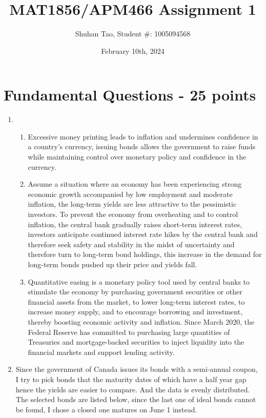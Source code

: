 \documentclass{article}
\title{MAT1856/APM466 Assignment 1}
\author{Shuhan Tao, Student \#: 1005094568}
\date{February 10th, 2024}
\begin{document}
\maketitle

\section*{Fundamental Questions - 25 points}

\begin{enumerate}
    \item \hfill
    \begin{enumerate}
        \item Excessive money printing leads to inflation and undermines confidence in a country's currency, issuing bonds allows the government to raise funds while maintaining control over monetary policy and confidence in the currency.
        \item Assume a situation where an economy has been experiencing strong economic growth accompanied by low employment and moderate inflation, the long-term yields are less attractive to the pessimistic investors. To prevent the economy from overheating and to control inflation, the central bank gradually raises short-term interest rates, investors anticipate continued interest rate hikes by the central bank and therefore seek safety and stability in the midst of uncertainty and therefore turn to long-term bond holdings, this increase in the demand for long-term bonds pushed up their price and yields fall.
        \item Quantitative easing is a monetary policy tool used by central banks to stimulate the economy by purchasing government securities or other financial assets from the market, to lower long-term interest rates, to increase money supply, and to encourage borrowing and investment, thereby boosting economic activity and inflation. Since March 2020, the Federal Reserve has committed to purchasing large quantities of Treasuries and mortgage-backed securities to inject liquidity into the financial markets and support lending activity. 
    \end{enumerate}
    \item Since the government of Canada issues its bonds with a semi-annual coupon, I try to pick bonds that the maturity dates of which have a half year gap hence the yields are easier to compare. And the data is evenly distributed. The selected bonds are listed below, since the last one of ideal bonds cannot be found, I chose a closed one matures on June 1 instead.

\end{enumerate}
\end{document}
